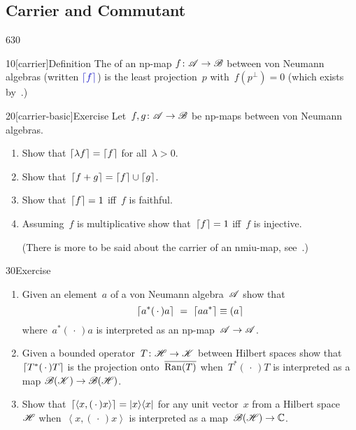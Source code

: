 \subsection{Carrier and Commutant}
\begin{parsec}{630}%
\begin{point}{10}[carrier]{Definition}%
The %
of an np-map $f\colon \mathscr{A}\to\mathscr{B}$
between von Neumann algebras
(written $\Define{\ceil{f}}$)%
is the least projection~$p$
with~$f(p^\perp)=0$
(which exists by~.)
\end{point}
\begin{point}{20}[carrier-basic]{Exercise}%
Let~$f,g\colon \mathscr{A}\to\mathscr{B}$
be np-maps between von Neumann algebras.
\begin{enumerate}
\item
Show that $\left\lceil\lambda f\right\rceil=\left\lceil f\right\rceil$
for all~$\lambda>0$.
\item
Show that~$\left\lceil f+g\right\rceil=\left\lceil f\right\rceil\cup\left\lceil g\right\rceil$.
\item
Show that~$\left\lceil f\right\rceil=1$ iff~$f$ is faithful.
\item
Assuming~$f$ is multiplicative
show that~$\left\lceil f\right\rceil=1$ iff~$f$ is injective.

(There is more to be said about
the carrier of an nmiu-map, see~.)
\end{enumerate}
\end{point}
\begin{point}{30}{Exercise}%
\begin{enumerate}
\item
Given an element~$a$ of a von Neumann algebra~$\mathscr{A}$
show that 
\begin{equation*}
\ceil{a^*(\,\cdot\,)a}\ =\ \ceil{aa^*}\equiv \ceilr{a}
\end{equation*}
where~$a^*(\,\cdot\,)a$
is interpreted as an np-map~$\mathscr{A}\to\mathscr{A}$.
\item
Given a bounded operator~$T\colon \mathscr{H}\to\mathscr{K}$
between Hilbert spaces
show that~$\left\lceil T^*(\,\cdot\,)T\right\rceil$
is the projection onto~$\overline{\operatorname{Ran}(T)}$
when~$T^*(\,\cdot\,)T$
is interpreted 
as a map
$\mathscr{B}(\mathscr{K})\to\mathscr{B}(\mathscr{H})$.
\item
Show that~$\left\lceil\left<x,(\,\cdot\,)x\right>\right\rceil=\left|x\right>\!\left<x\right|$
for any unit vector~$x$ from a Hilbert space~$\mathscr{H}$
when~$\left<x,(\,\cdot\,)x\right>$
is interpreted as a map~$\mathscr{B}(\mathscr{H})\to\mathbb{C}$.


\end{enumerate}
\end{point}
\end{parsec}
